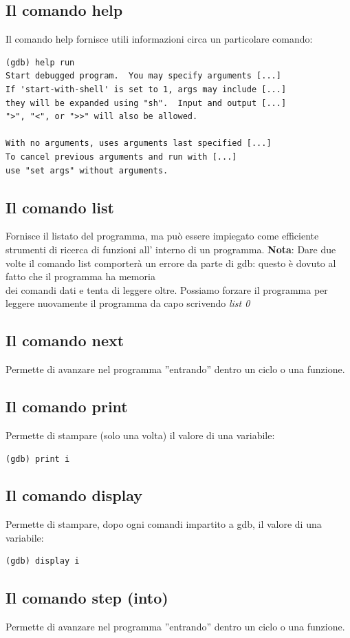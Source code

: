 \documentclass[a4paper,12pt]{article} %
\begin{document}
\subsection{Il comando help}
Il comando help fornisce utili informazioni circa un particolare comando:
\begin{lstlisting}
(gdb) help run
Start debugged program.  You may specify arguments [...]
If 'start-with-shell' is set to 1, args may include [...]
they will be expanded using "sh".  Input and output [...]
">", "<", or ">>" will also be allowed.

With no arguments, uses arguments last specified [...]
To cancel previous arguments and run with [...]
use "set args" without arguments.
\end{lstlisting}
\subsection{Il comando list}
Fornisce il listato del programma, ma può essere impiegato come efficiente strumenti di ricerca di funzioni all' interno di un programma.
\textbf{Nota}: Dare due volte il comando list comporterà un errore da parte di gdb: questo è dovuto al fatto che il programma ha memoria \\
dei comandi dati e tenta di leggere oltre. Possiamo forzare il programma per leggere nuovamente il programma da capo scrivendo \textit{list 0}
\subsection{Il comando next}
Permette di avanzare nel programma ''entrando'' dentro un ciclo o una funzione.
\subsection{Il comando print}
Permette di stampare (solo una volta) il valore di una variabile:
\begin{lstlisting}
(gdb) print i
\end{lstlisting}
\subsection{Il comando display}
Permette di stampare, dopo ogni comandi impartito a gdb, il valore di una variabile:
\begin{lstlisting}
(gdb) display i
\end{lstlisting}
\subsection{Il comando step (into)}
Permette di avanzare nel programma ''entrando'' dentro un ciclo o una funzione.
\end{document}
